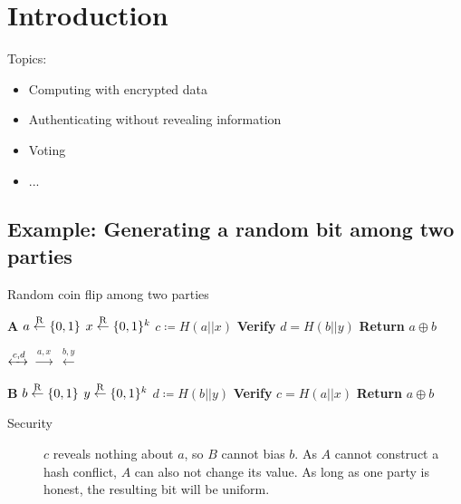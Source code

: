 \section{Introduction}

Topics:
\begin{itemize}
		\item Computing with encrypted data
		\item Authenticating without revealing information
		\item Voting
		\item ...
\end{itemize}

\subsection{Example: Generating a random bit among two parties}

\begin{algorithm}
		\caption{Random coin flip among two parties}
		\begin{multicols}{3}
				\begin{algorithmic}[0]
						\State \textbf{A}
						\State $a \overset{\mathrm{R}}{\gets} \{0, 1\}$
						\State $x \overset{\mathrm{R}}{\gets} \{0, 1\}^k$
						\State $c \coloneqq H(a || x)$
						\State
						\State \textbf{Verify} $d = H(b || y)$
						\State \textbf{Return} $a \oplus b$
				\end{algorithmic}

				\columnbreak

				\begin{algorithmic}[0]
						\State 
						\State 
						\State 
						\State $\xleftrightarrow{c, d}$
						\State $\xrightarrow{a, x}$
						\State $\xleftarrow{b, y}$
				\end{algorithmic}

				\columnbreak

				\begin{algorithmic}[0]
						\State \textbf{B}
						\State $b \overset{\mathrm{R}}{\gets} \{0, 1\}$
						\State $y \overset{\mathrm{R}}{\gets} \{0, 1\}^k$
						\State $d \coloneqq H(b || y)$
						\State \textbf{Verify} $c = H(a || x)$
						\State
						\State \textbf{Return} $a \oplus b$
				\end{algorithmic}
		\end{multicols}
\end{algorithm}

\begin{description}
		\item[Security] $c$ reveals nothing about $a$, so $B$ cannot bias $b$.
				As $A$ cannot construct a hash conflict, $A$ can also not
				change its value. As long as one party is honest, the resulting
				bit will be uniform.
\end{description}

